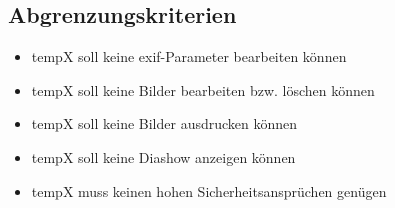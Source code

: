\subsection{Abgrenzungskriterien} 
\begin{itemize}
	\item \gls{tempX} soll keine \gls{exif}-Parameter bearbeiten können
	\item \gls{tempX} soll keine Bilder bearbeiten bzw. löschen können
	\item \gls{tempX} soll keine Bilder ausdrucken können
	\item \gls{tempX} soll keine Diashow anzeigen können
	\item \gls{tempX} muss keinen hohen Sicherheitsansprüchen genügen
\end{itemize}